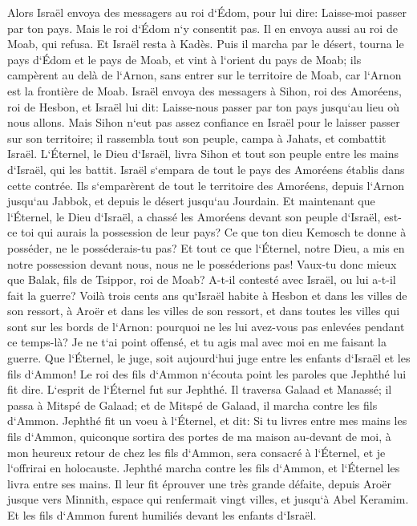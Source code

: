 \verse Alors Israël envoya des messagers au roi d`Édom, pour lui dire: Laisse-moi passer par ton pays. Mais le roi d`Édom n`y consentit pas. Il en envoya aussi au roi de Moab, qui refusa. Et Israël resta à Kadès. 
\verse Puis il marcha par le désert, tourna le pays d`Édom et le pays de Moab, et vint à l`orient du pays de Moab; ils campèrent au delà de l`Arnon, sans entrer sur le territoire de Moab, car l`Arnon est la frontière de Moab. 
\verse Israël envoya des messagers à Sihon, roi des Amoréens, roi de Hesbon, et Israël lui dit: Laisse-nous passer par ton pays jusqu`au lieu où nous allons. 
\verse Mais Sihon n`eut pas assez confiance en Israël pour le laisser passer sur son territoire; il rassembla tout son peuple, campa à Jahats, et combattit Israël. 
\verse L`Éternel, le Dieu d`Israël, livra Sihon et tout son peuple entre les mains d`Israël, qui les battit. Israël s`empara de tout le pays des Amoréens établis dans cette contrée. 
\verse Ils s`emparèrent de tout le territoire des Amoréens, depuis l`Arnon jusqu`au Jabbok, et depuis le désert jusqu`au Jourdain. 
\verse Et maintenant que l`Éternel, le Dieu d`Israël, a chassé les Amoréens devant son peuple d`Israël, est-ce toi qui aurais la possession de leur pays? 
\verse Ce que ton dieu Kemosch te donne à posséder, ne le posséderais-tu pas? Et tout ce que l`Éternel, notre Dieu, a mis en notre possession devant nous, nous ne le posséderions pas! 
\verse Vaux-tu donc mieux que Balak, fils de Tsippor, roi de Moab? A-t-il contesté avec Israël, ou lui a-t-il fait la guerre? 
\verse Voilà trois cents ans qu`Israël habite à Hesbon et dans les villes de son ressort, à Aroër et dans les villes de son ressort, et dans toutes les villes qui sont sur les bords de l`Arnon: pourquoi ne les lui avez-vous pas enlevées pendant ce temps-là? 
\verse Je ne t`ai point offensé, et tu agis mal avec moi en me faisant la guerre. Que l`Éternel, le juge, soit aujourd`hui juge entre les enfants d`Israël et les fils d`Ammon! 
\verse Le roi des fils d`Ammon n`écouta point les paroles que Jephthé lui fit dire. 
\verse L`esprit de l`Éternel fut sur Jephthé. Il traversa Galaad et Manassé; il passa à Mitspé de Galaad; et de Mitspé de Galaad, il marcha contre les fils d`Ammon. 
\verse Jephthé fit un voeu à l`Éternel, et dit: Si tu livres entre mes mains les fils d`Ammon, 
\verse quiconque sortira des portes de ma maison au-devant de moi, à mon heureux retour de chez les fils d`Ammon, sera consacré à l`Éternel, et je l`offrirai en holocauste. 
\verse Jephthé marcha contre les fils d`Ammon, et l`Éternel les livra entre ses mains. 
\verse Il leur fit éprouver une très grande défaite, depuis Aroër jusque vers Minnith, espace qui renfermait vingt villes, et jusqu`à Abel Keramim. Et les fils d`Ammon furent humiliés devant les enfants d`Israël. 
